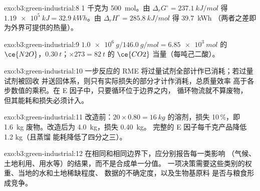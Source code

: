 \begin{solution}{exo:b3:green-industrial:8}
1 千克为 \qty{500}{mol}。由 $\Delta_rG^\circ = \qty{237.1}{kJ/mol}$ 得 $\qty{1.19e5}{kJ} = \qty{32.9}{kWh}$。由 $\Delta_rH^\circ = \qty{285.8}{kJ/mol}$ 得 \qty{39.7}{kWh}
（两者之差即为外界可提供的热量）。
\end{solution}

\begin{solution}{exo:b3:green-industrial:9}
$\qty{1.0e6}{g}/\qty{146.0}{g/mol} = \qty{6.85e3}{mol}$ 的 $\ce{N2O}$，$\qty{0.30}{t}$；$\times 273 = \qty{82}{t}$ 的 $\ce{CO2}$ 当量（每吨己二酸）。
\end{solution}

\begin{solution}{exo:b3:green-industrial:10}
一步反应的 RME 将过量试剂全部计作已消耗；若过量试剂被回收
并送回体系，则只有实际损失的部分才计作消耗，总质量效率
高于各步数值的乘积。在 E 因子中，只要循环位于边界之内，
循环物流就不算废物，
但其能耗和损失必须计入。
\end{solution}

\begin{solution}{exo:b3:green-industrial:11}
改造前：$20 \times 0.80 = \qty{16}{kg}$ 的溶剂，损失 10\,\%，即 \qty{1.6}{kg} 废物。改造后为 \qty{4.0}{kg}，损失 \qty{0.40}{kg}。
完整的 E 因子每千克产品降低 1.2 kg（且蒸馏
能耗降低了四分之三）。
\end{solution}

\begin{solution}{exo:b3:green-industrial:12}
在相同和相同边界下，应分别报告每一类影响
（气候、土地利用、用水等）的结果，而不是合成单一分值。
一项决策需要这些类别的权重、当地的水和土地稀缺程度、
数据的不确定度，以及生物基原料
是否与粮食形成竞争。
\end{solution}

